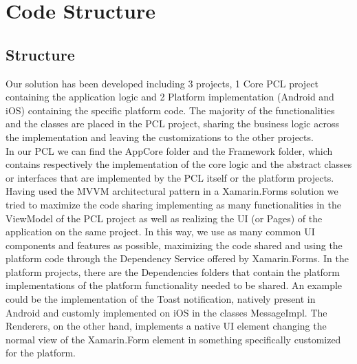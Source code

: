 \chapter{Code Structure}
\label{cha:structure}
\section{Structure}
Our solution has been developed including 3 projects, 1 Core PCL project containing the application logic and 2 Platform implementation (Android and iOS) containing the specific platform code. 
The majority of the functionalities and the classes are placed in the PCL project, sharing the business logic across the implementation and leaving the customizations to the other projects. \\
In our PCL we can find the AppCore folder and the Framework folder, which contains respectively the implementation of the core logic and the abstract classes or interfaces that are implemented by the PCL itself or the platform projects.
Having used the MVVM architectural pattern in a Xamarin.Forms solution we tried to maximize the code sharing implementing as many functionalities in the ViewModel of the PCL project as well as realizing the UI (or Pages) of the application on the same project.
In this way, we use as many common UI components and features as possible, maximizing the code shared and using the platform code through the Dependency Service offered by Xamarin.Forms.
In the platform projects, there are the Dependencies folders that contain the platform implementations of the platform functionality needed to be shared. An example could be the implementation of the Toast notification, natively present in Android and customly implemented on iOS in the classes MessageImpl.
The Renderers, on the other hand, implements a native UI element changing the normal view of the Xamarin.Form element in something specifically customized for the platform.

